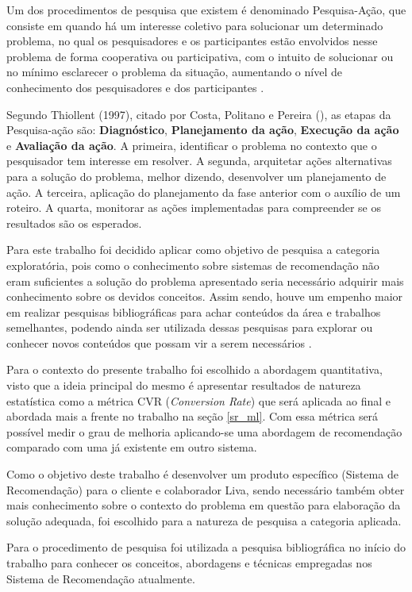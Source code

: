Um dos procedimentos de pesquisa que existem é denominado Pesquisa-Ação, que consiste em quando há um interesse coletivo para solucionar um determinado problema, no qual os pesquisadores e os participantes estão envolvidos nesse problema de forma cooperativa ou participativa, com o intuito de solucionar ou no mínimo esclarecer o problema da situação, aumentando o nível de conhecimento dos pesquisadores e dos participantes \cite{de2013metodologia}.

Segundo Thiollent (1997), citado por Costa, Politano e Pereira (\citeyear{Costa}), as etapas da Pesquisa-ação são: \textbf{Diagnóstico}, \textbf{Planejamento da ação}, \textbf{Execução da ação} e \textbf{Avaliação da ação}. A primeira, identificar o problema no contexto que o pesquisador tem interesse em resolver. A segunda, arquitetar ações alternativas para a solução do problema, melhor dizendo, desenvolver um planejamento de ação. A terceira, aplicação do planejamento da fase anterior com o auxílio de um roteiro. A quarta, monitorar as ações implementadas para compreender se os resultados são os esperados.

Para este trabalho foi decidido aplicar como objetivo de pesquisa a categoria exploratória, pois como o conhecimento sobre sistemas de recomendação não eram suficientes a solução do problema apresentado seria necessário adquirir mais conhecimento sobre os devidos conceitos. Assim sendo, houve um empenho maior em realizar pesquisas bibliográficas para achar conteúdos da área e trabalhos semelhantes, podendo ainda ser utilizada dessas pesquisas para explorar ou conhecer novos conteúdos que possam vir a serem necessários \cite{Moretti:2018}.

Para o contexto do presente trabalho foi escolhido a abordagem quantitativa, visto que a ideia principal do mesmo é apresentar resultados de natureza estatística como a métrica CVR (\textit{Conversion Rate}) que será aplicada ao final e abordada mais a frente no trabalho na seção \ref{sr_ml}. Com essa métrica será possível medir o grau de melhoria aplicando-se uma abordagem de recomendação comparado com uma já existente em outro sistema.

Como o objetivo deste trabalho é desenvolver um produto específico (Sistema de Recomendação) para o cliente e colaborador Liva, sendo necessário também obter mais conhecimento sobre o contexto do problema em questão para elaboração da solução adequada, foi escolhido para a natureza de pesquisa a categoria aplicada.

Para o procedimento de pesquisa foi utilizada a pesquisa bibliográfica no início do trabalho para conhecer os conceitos, abordagens e técnicas empregadas nos Sistema de Recomendação atualmente.

